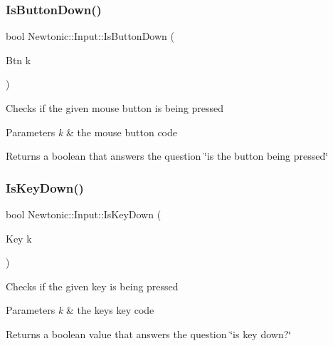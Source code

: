 \subsubsection{\texorpdfstring{IsButtonDown()}{IsButtonDown()}}
{\footnotesize\ttfamily bool Newtonic\+::\+Input\+::\+Is\+Button\+Down (\begin{DoxyParamCaption}\item[{Btn}]{k }\end{DoxyParamCaption})\hspace{0.3cm}{\ttfamily [inline]}}

Checks if the given mouse button is being pressed 
\begin{DoxyParams}{Parameters}
{\em k} & the mouse button code \\
\hline
\end{DoxyParams}
\begin{DoxyReturn}{Returns}
a boolean that answers the question \char`\"{}is the button being pressed\char`\"{} 
\end{DoxyReturn}
\mbox{\label{classNewtonic_1_1Input_a70ff2b8ec9b2a1792f8aa57fa7d29a34}} 
\subsubsection{\texorpdfstring{IsKeyDown()}{IsKeyDown()}}
{\footnotesize\ttfamily bool Newtonic\+::\+Input\+::\+Is\+Key\+Down (\begin{DoxyParamCaption}\item[{Key}]{k }\end{DoxyParamCaption})\hspace{0.3cm}{\ttfamily [inline]}}

Checks if the given key is being pressed 
\begin{DoxyParams}{Parameters}
{\em k} & the key\textquotesingle{}s key code \\
\hline
\end{DoxyParams}
\begin{DoxyReturn}{Returns}
a boolean value that answers the question \char`\"{}is key down?\char`\"{} 
\end{DoxyReturn}
\mbox{\label{classNewtonic_1_1Input_a856bd9a3e0759dfc9cb5311ca401a699}} 
